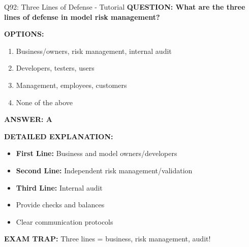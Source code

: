 \documentclass[8pt]{beamer}
\begin{document}
	\begin{frame}{Q92: Three Lines of Defense - Tutorial}
		\fontsize{6.5}{7.5}\selectfont
		\textbf{QUESTION: What are the three lines of defense in model risk management?}
		
		\vspace{0.1cm}
		\textbf{OPTIONS:}
		\begin{enumerate}
			\item Business/owners, risk management, internal audit
			\item Developers, testers, users
			\item Management, employees, customers
			\item None of the above
		\end{enumerate}
		
		\vspace{0.1cm}
		\textcolor{myblue}{\textbf{ANSWER: A}}
		
		\vspace{0.1cm}
		\textbf{DETAILED EXPLANATION:}
		\begin{itemize}
			\item \textbf{First Line:} Business and model owners/developers
			\item \textbf{Second Line:} Independent risk management/validation
			\item \textbf{Third Line:} Internal audit
			\item Provide checks and balances
			\item Clear communication protocols
		\end{itemize}
		
		\vspace{0.1cm}
		\textcolor{myred}{\textbf{EXAM TRAP:}} Three lines = \textcolor{myblue}{business, risk management, audit}!
	\end{frame}
	
\end{document}
